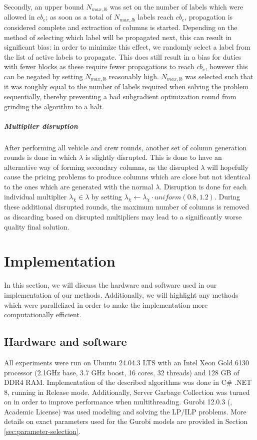 \documentclass[]{article}
\begin{document}
Secondly, an upper bound $N_{max,lb}$ was set on the number of labels which were allowed in $cb_e$; as soon as a total of $N_{max,lb}$ labels reach $cb_e$, propagation is considered complete and extraction of columns is started. Depending on the method of selecting which label will be propagated next, this can result in significant bias: in order to minimize this effect, we randomly select a label from the list of active labels to propagate. This does still result in a bias for duties with fewer blocks as these  require fewer propagations to reach $cb_e$, however this can be negated by setting $N_{max,lb}$ reasonably high. $N_{max,lb}$ was selected such that it was roughly equal to the number of labels required when solving the problem sequentially, thereby preventing a bad subgradient optimization round from grinding the algorithm to a halt.

\subparagraph{Multiplier disruption} After performing all vehicle and crew rounds, another set of column generation rounds is done in which $\lambda$ is slightly disrupted. This is done to have an alternative way of forming secondary columns, as the disrupted $\lambda$ will hopefully cause the pricing problems to produce columns which are close but not identical to the ones which are generated with the normal $\lambda$. Disruption is done for each individual multiplier $\lambda_\chi \in \lambda$ by setting $\lambda_\chi \gets \lambda_\chi \cdot \textit{uniform}(0.8,1.2)$. During these additional disrupted rounds, the maximum number of columns is removed as discarding based on disrupted multipliers may lead to a significantly worse quality final solution. 

\section{Implementation}
In this section, we will discuss the hardware and software used in our implementation of our methods. Additionally, we will highlight any methods which were parallelized in order to make the implementation more computationally efficient. 

\subsection{Hardware and software}
All experiments were run on Ubuntu 24.04.3 LTS with an Intel Xeon Gold 6130 processor (2.1GHz base, 3.7 GHz boost, 16 cores, 32 threads) and 128 GB of DDR4 RAM.  Implementation of the described algorithms was done in C\# .NET 8, running in Release mode. Additionally, Server Garbage Collection was turned on in order to improve performance when multithreading. Gurobi 12.0.3 (\citet{Gurobi2025}, Academic License) was used modeling and solving the LP/ILP problems. More details on exact parameters used for the Gurobi models are provided in Section \ref{sec:parameter-selection}.
\end{document}
